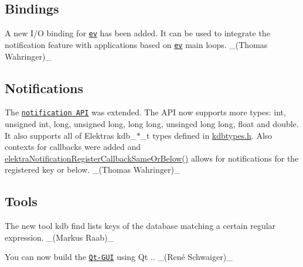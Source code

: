 \subsection*{Bindings}


\begin{DoxyItemize}
\item A new I/O binding for \href{https://www.libelektra.org/bindings/io_ev}{\tt ev} has been added. It can be used to integrate the notification feature with applications based on \href{http://libev.schmorp.de}{\tt ev} main loops. \+\_\+(\+Thomas Wahringer)\+\_\+
\end{DoxyItemize}

\subsection*{Notifications}


\begin{DoxyItemize}
\item The \href{https://doc.libelektra.org/api/current/html/group__kdbnotification.html}{\tt notification A\+PI} was extended. The A\+PI now supports more types\+: {\ttfamily int}, {\ttfamily unsigned int}, {\ttfamily long}, {\ttfamily unsigned long}, {\ttfamily long long}, {\ttfamily unsinged long long}, {\ttfamily float} and {\ttfamily double}. It also supports all of Elektra\textquotesingle{}s {\ttfamily kdb\+\_\+$\ast$\+\_\+t} types defined in {\ttfamily \hyperlink{kdbtypes_8h}{kdbtypes.\+h}}. Also contexts for callbacks were added and {\ttfamily \hyperlink{group__kdbnotification_ga374edd4f4fff527d6511ce4d0df62681}{elektra\+Notification\+Register\+Callback\+Same\+Or\+Below()}} allows for notifications for the registered key or below. \+\_\+(\+Thomas Wahringer)\+\_\+
\end{DoxyItemize}

\subsection*{Tools}


\begin{DoxyItemize}
\item The new tool {\ttfamily kdb find} lists keys of the database matching a certain regular expression. \+\_\+(\+Markus Raab)\+\_\+
\item You can now build the \href{https://www.libelektra.org/tools/qt-gui}{\tt Qt-\/\+G\+UI} using Qt {.}. \+\_\+(René Schwaiger)\+\_\+
\end{DoxyItemize}

